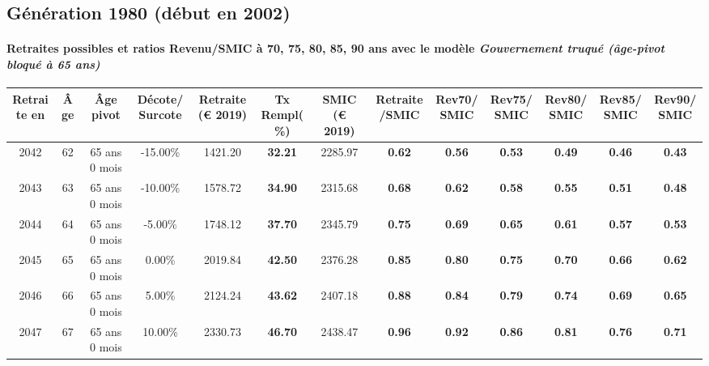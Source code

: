 \newpage 
 
\subsection{Génération 1980 (début en 2002)} 

\paragraph{Retraites possibles et ratios Revenu/SMIC à 70, 75, 80, 85, 90 ans avec le modèle \emph{Gouvernement truqué (âge-pivot bloqué à 65 ans)}}  
 
{ \scriptsize \begin{center} 
\begin{tabular}[htb]{|c|c||c|c||c|c||c||c|c|c|c|c|c|} 
\hline 
 Retraite en &  Âge &  Âge pivot &  Décote/Surcote &  Retraite (\euro{} 2019) &  Tx Rempl(\%) &  SMIC (\euro{} 2019) &  Retraite/SMIC &  Rev70/SMIC &  Rev75/SMIC &  Rev80/SMIC &  Rev85/SMIC &  Rev90/SMIC \\ 
\hline \hline 
 2042 &  62 &  65 ans 0 mois &  -15.00\% &  1421.20 &  {\bf 32.21} &  2285.97 &  {\bf {\color{red} 0.62}} &  {\bf {\color{red} 0.56}} &  {\bf {\color{red} 0.53}} &  {\bf {\color{red} 0.49}} &  {\bf {\color{red} 0.46}} &  {\bf {\color{red} 0.43}} \\ 
\hline 
 2043 &  63 &  65 ans 0 mois &  -10.00\% &  1578.72 &  {\bf 34.90} &  2315.68 &  {\bf {\color{red} 0.68}} &  {\bf {\color{red} 0.62}} &  {\bf {\color{red} 0.58}} &  {\bf {\color{red} 0.55}} &  {\bf {\color{red} 0.51}} &  {\bf {\color{red} 0.48}} \\ 
\hline 
 2044 &  64 &  65 ans 0 mois &  -5.00\% &  1748.12 &  {\bf 37.70} &  2345.79 &  {\bf {\color{red} 0.75}} &  {\bf {\color{red} 0.69}} &  {\bf {\color{red} 0.65}} &  {\bf {\color{red} 0.61}} &  {\bf {\color{red} 0.57}} &  {\bf {\color{red} 0.53}} \\ 
\hline 
 2045 &  65 &  65 ans 0 mois &  0.00\% &  2019.84 &  {\bf 42.50} &  2376.28 &  {\bf {\color{red} 0.85}} &  {\bf {\color{red} 0.80}} &  {\bf {\color{red} 0.75}} &  {\bf {\color{red} 0.70}} &  {\bf {\color{red} 0.66}} &  {\bf {\color{red} 0.62}} \\ 
\hline 
 2046 &  66 &  65 ans 0 mois &  5.00\% &  2124.24 &  {\bf 43.62} &  2407.18 &  {\bf {\color{red} 0.88}} &  {\bf {\color{red} 0.84}} &  {\bf {\color{red} 0.79}} &  {\bf {\color{red} 0.74}} &  {\bf {\color{red} 0.69}} &  {\bf {\color{red} 0.65}} \\ 
\hline 
 2047 &  67 &  65 ans 0 mois &  10.00\% &  2330.73 &  {\bf 46.70} &  2438.47 &  {\bf {\color{red} 0.96}} &  {\bf {\color{red} 0.92}} &  {\bf {\color{red} 0.86}} &  {\bf {\color{red} 0.81}} &  {\bf {\color{red} 0.76}} &  {\bf {\color{red} 0.71}} \\ 
\hline 
\hline 
\end{tabular} 
\end{center} } 
